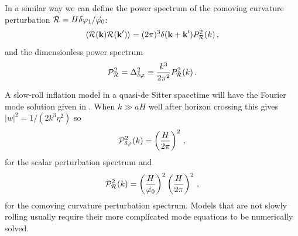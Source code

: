 In a similar way we can define the power spectrum of the comoving curvature
perturbation $\mathcal{R} = H\delta\varphi_{1}/\dot{\varphi_0}$:
% 
\begin{equation}
 \label{eq:Prdefn-intro}
 \langle \mathcal{R}(\textbf{k}) \mathcal{R}(\textbf{k}') \rangle 
   = (2\pi)^3 \delta(\textbf{k} + \textbf{k}') P_{\mathcal{R}}^2 (k)\,,
\end{equation}
%
and the dimensionless power spectrum
% 
\begin{equation}
 \mathcal{P}_{\mathcal{R}}^2 = \Delta^2_{\delta\varphi_{}} \equiv \frac{k^3}{2\pi^2}
P_{\mathcal{R}}^2(k)\,.
\end{equation}

A slow-roll inflation model in a quasi-de Sitter spacetime will have the
Fourier mode solution given in . When $k\gg aH$ well after
horizon crossing this gives $|w|^2 = 1/(2k^3 \eta^2)$ so 
% 
\begin{equation}
\label{eq:pphi-intro}
 \mathcal{P}_{\delta\varphi_{}}^2(k) = \left(\frac{H}{2\pi}\right)^2 \,,
\end{equation}
% 
for the scalar perturbation spectrum and
% 
\begin{equation}
 \mathcal{P}_{\mathcal{R}}^2 (k) = \left(\frac{H}{\dot{\varphi_0}}\right)^2 \left(\frac{H}{2\pi}\right)^2\,,
\end{equation}
% 
for the comoving curvature perturbation spectrum. Models that are not
slowly rolling usually require their more complicated mode equations to be
numerically solved. 

